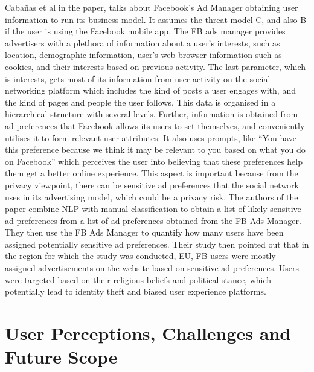 \documentclass[sigconf,nonacm]{acmart}
\begin{document}
Cabañas et al \cite{justfacebook} in the paper, talks about Facebook’s Ad Manager obtaining user information to run its business model. It assumes the threat model C, and also B if the user is using the Facebook mobile app. The FB ads manager provides advertisers with a plethora of information about a user’s interests, such as location, demographic information, user’s web browser information such as cookies, and their interests based on previous activity. The last parameter, which is interests, gets most of its information from user activity on the social networking platform which includes the kind of posts a user engages with, and the kind of pages and people the user follows. This data is organised in a hierarchical structure with several levels. Further, information is obtained from ad preferences that Facebook allows its users to set themselves, and conveniently utilises it to form relevant user attributes. It also uses prompts, like “You have this preference because we think it may be relevant to you based on what you do on Facebook” which perceives the user into believing that these preferences help them get a better online experience. This aspect is important because from the privacy viewpoint, there can be sensitive ad preferences that the social network uses in its advertising model, which could be a privacy risk. The authors of the paper combine NLP with manual classification to obtain a list of likely sensitive ad preferences from a list of ad preferences obtained from the FB Ads Manager. They then use the FB Ads Manager to quantify how many users have been assigned potentially sensitive ad preferences. Their study then pointed out that in the region for which the study was conducted, EU, FB users were mostly assigned advertisements on the website based on sensitive ad preferences. Users were targeted based on their religious beliefs and political stance, which potentially lead to identity theft and biased user experience platforms. 

\section{User Perceptions, Challenges and Future Scope}
\end{document}
